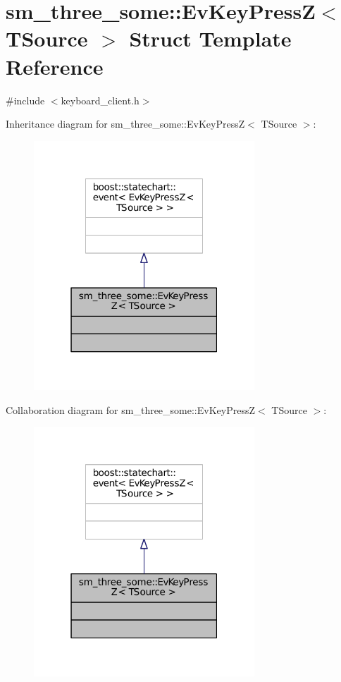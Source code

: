 \hypertarget{structsm__three__some_1_1EvKeyPressZ}{}\section{sm\+\_\+three\+\_\+some\+:\+:Ev\+Key\+PressZ$<$ T\+Source $>$ Struct Template Reference}
\label{structsm__three__some_1_1EvKeyPressZ}


{\ttfamily \#include $<$keyboard\+\_\+client.\+h$>$}



Inheritance diagram for sm\+\_\+three\+\_\+some\+:\+:Ev\+Key\+PressZ$<$ T\+Source $>$\+:
\nopagebreak
\begin{figure}[H]
\begin{center}
\leavevmode
\includegraphics[width=235pt]{structsm__three__some_1_1EvKeyPressZ__inherit__graph}
\end{center}
\end{figure}


Collaboration diagram for sm\+\_\+three\+\_\+some\+:\+:Ev\+Key\+PressZ$<$ T\+Source $>$\+:
\nopagebreak
\begin{figure}[H]
\begin{center}
\leavevmode
\includegraphics[width=235pt]{structsm__three__some_1_1EvKeyPressZ__coll__graph}
\end{center}
\end{figure}


